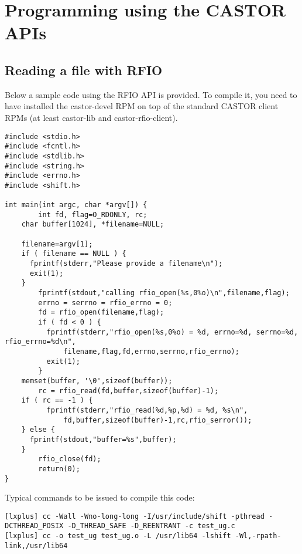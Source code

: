 \chapter{Programming using the CASTOR APIs}
\section{Reading a file with RFIO}

Below a sample code using the RFIO API is provided. To compile it, you need to have installed the
castor-devel RPM on top of the standard CASTOR client RPMs (at least castor-lib and castor-rfio-client).

\begin{verbatim}
#include <stdio.h>
#include <fcntl.h>
#include <stdlib.h>
#include <string.h>
#include <errno.h>
#include <shift.h>

int main(int argc, char *argv[]) {
        int fd, flag=O_RDONLY, rc;
	char buffer[1024], *filename=NULL;

	filename=argv[1];
	if ( filename == NULL ) {
	  fprintf(stderr,"Please provide a filename\n");
	  exit(1);
	}
        fprintf(stdout,"calling rfio_open(%s,0%o)\n",filename,flag);
        errno = serrno = rfio_errno = 0;
        fd = rfio_open(filename,flag);
        if ( fd < 0 ) {
          fprintf(stderr,"rfio_open(%s,0%o) = %d, errno=%d, serrno=%d, rfio_errno=%d\n",
	          filename,flag,fd,errno,serrno,rfio_errno);
          exit(1);
        }
	memset(buffer, '\0',sizeof(buffer));
        rc = rfio_read(fd,buffer,sizeof(buffer)-1);
	if ( rc == -1 ) {
          fprintf(stderr,"rfio_read(%d,%p,%d) = %d, %s\n",
	          fd,buffer,sizeof(buffer)-1,rc,rfio_serror());
	} else {
	  fprintf(stdout,"buffer=%s",buffer);
	}
        rfio_close(fd);
        return(0);
}
\end{verbatim}

Typical commands to be issued to compile this code:

\begin{verbatim}
[lxplus] cc -Wall -Wno-long-long -I/usr/include/shift -pthread -DCTHREAD_POSIX -D_THREAD_SAFE -D_REENTRANT -c test_ug.c
[lxplus] cc -o test_ug test_ug.o -L /usr/lib64 -lshift -Wl,-rpath-link,/usr/lib64
\end{verbatim}

